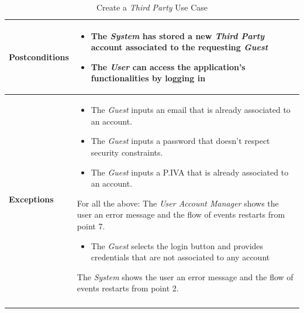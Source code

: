 \documentclass[titlepage]{article}
\begin{document}
\begin{longtable}{| p{3 cm} | p{10 cm} |}
			 \\
			\hline
			{\bf Postconditions} & 
							\begin{itemize}
								\item The {\it System} has stored a new {\it Third Party} account associated to the 										requesting {\it Guest}
								\item The {\it User} can access the application’s functionalities by logging in
							\end{itemize}
			\\
			\hline
			{\bf Exceptions} & 
							\begin{itemize}
								\item The {\it {\it Guest}} inputs an email that is already associated to an account. 
								\item The {\it {\it Guest}} inputs a password that doesn’t respect security constraints. 								\item The 	{\it {\it Guest}} inputs a P.IVA that is already associated to an account. 
							\end{itemize} 
							For all the above: The {\it User Account Manager} shows the user an error message and the flow of events restarts from point 7.
							\begin{itemize}
								\item The {\it {\it Guest}}  selects the login button and provides credentials that are not 									associated to any account
							\end{itemize} 
							The {\it System} shows the user an error message and the flow of events 							restarts from point 2.
							
			\\
			\hline
			\caption{Create a {\it Third Party} Use Case}
			\end{longtable}
\end{document}
